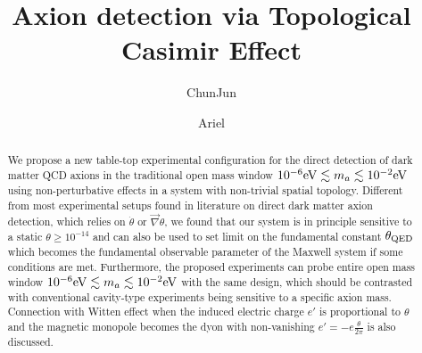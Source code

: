 \documentclass[ twocolumn,aps,prd,   
               preprintnumbers,numbers,sort&compress,nofootinbib,
                            showpacs,superscriptaddress,
               colorlinks,
               linkcolor=blue,   
               citecolor=blue]{revtex4-1}   \newcommand{\exclude}[1]{}
\begin{document}

\title{ Axion detection via Topological Casimir Effect  }



 \author{ChunJun }
 
\author{Ariel }


\begin{abstract}
We propose a new table-top experimental configuration for the direct detection of dark matter QCD axions  in the traditional open mass window $10^{-6} {\rm eV}\lesssim  m_a\lesssim   10^{-2} {\rm eV}$     using non-perturbative effects in a system with non-trivial spatial topology.
  Different from most experimental setups found in literature on direct dark matter axion detection, which relies on $\dot{\theta}$ or $\vec{\nabla}\theta$, we found that our system is in principle sensitive to a static $\theta\geq  10^{-14}$ and can also be used to set limit on the fundamental constant $\theta_{\rm QED}$ which becomes the fundamental observable parameter of the Maxwell system if some conditions are met. 
  Furthermore, the proposed experiments can probe entire open mass window  $10^{-6} {\rm eV}\lesssim  m_a\lesssim   10^{-2} {\rm eV}$   with the same design, which   should be contrasted with conventional cavity-type experiments  being  sensitive  to a specific axion mass.  
  Connection with Witten effect when the induced electric charge  $e'$ is proportional to $\theta$ and the magnetic monopole becomes the dyon with non-vanishing  $e'=-e \frac{\theta}{2\pi}$ is also discussed.
\end{abstract}


\maketitle

\baselineskip=15pt

\end{document}
